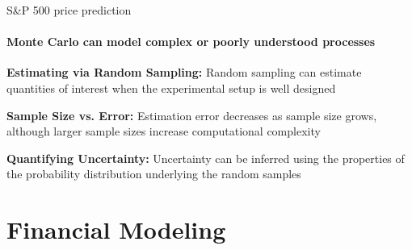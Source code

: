 \documentclass{beamer}
\begin{document}
\begin{frame}{S\&P 500 price prediction}
  \framesubtitle{Monte Carlo can model complex or poorly understood processes}

  \textbf{Estimating via Random Sampling:} Random sampling can estimate quantities
  of interest when the experimental setup is well designed

  \vspace{0.5cm}

  \textbf{Sample Size vs. Error:} Estimation error decreases as sample size grows,
  although larger sample sizes increase computational complexity

  \vspace{0.5cm}

  \textbf{Quantifying Uncertainty:} Uncertainty can be inferred using
  the properties of the probability distribution underlying the random samples

  \vspace{0.5cm}
\end{frame}

\section{Financial Modeling}
\end{document}

